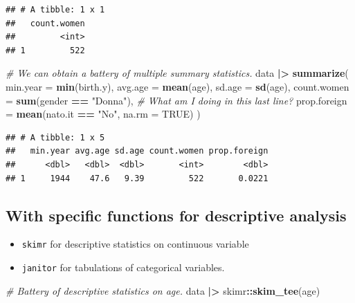 \documentclass[
]{book}
\newenvironment{Shaded}{\begin{snugshade}}{\end{snugshade}}
\newcommand{\AttributeTok}[1]{\textcolor[rgb]{0.13,0.29,0.53}{#1}}
\newcommand{\CommentTok}[1]{\textcolor[rgb]{0.56,0.35,0.01}{\textit{#1}}}
\newcommand{\ConstantTok}[1]{\textcolor[rgb]{0.56,0.35,0.01}{#1}}
\newcommand{\FunctionTok}[1]{\textcolor[rgb]{0.13,0.29,0.53}{\textbf{#1}}}
\newcommand{\NormalTok}[1]{#1}
\newcommand{\SpecialCharTok}[1]{\textcolor[rgb]{0.81,0.36,0.00}{\textbf{#1}}}
\newcommand{\StringTok}[1]{\textcolor[rgb]{0.31,0.60,0.02}{#1}}
\providecommand{\tightlist}{%
  \setlength{\itemsep}{0pt}\setlength{\parskip}{0pt}}
\begin{document}
\begin{verbatim}
## # A tibble: 1 x 1
##   count.women
##         <int>
## 1         522
\end{verbatim}

\begin{Shaded}
\begin{Highlighting}[]
\CommentTok{\# We can obtain a battery of multiple summary statistics.}
\NormalTok{data }\SpecialCharTok{|\textgreater{}} 
  \FunctionTok{summarize}\NormalTok{(}
    \AttributeTok{min.year =} \FunctionTok{min}\NormalTok{(birth.y),}
    \AttributeTok{avg.age =} \FunctionTok{mean}\NormalTok{(age),}
    \AttributeTok{sd.age =} \FunctionTok{sd}\NormalTok{(age),}
    \AttributeTok{count.women =} \FunctionTok{sum}\NormalTok{(gender }\SpecialCharTok{==} \StringTok{"Donna"}\NormalTok{),}
    \CommentTok{\# What am I doing in this last line?}
    \AttributeTok{prop.foreign =} \FunctionTok{mean}\NormalTok{(nato.it }\SpecialCharTok{==} \StringTok{"No"}\NormalTok{, }\AttributeTok{na.rm =} \ConstantTok{TRUE}\NormalTok{)}
\NormalTok{  )}
\end{Highlighting}
\end{Shaded}

\begin{verbatim}
## # A tibble: 1 x 5
##   min.year avg.age sd.age count.women prop.foreign
##      <dbl>   <dbl>  <dbl>       <int>        <dbl>
## 1     1944    47.6   9.39         522       0.0221
\end{verbatim}

\hypertarget{with-specific-functions-for-descriptive-analysis}{%
\subsection{With specific functions for descriptive analysis}\label{with-specific-functions-for-descriptive-analysis}}

\begin{itemize}
\tightlist
\item
  \texttt{skimr} for descriptive statistics on continuous variable
\item
  \texttt{janitor} for tabulations of categorical variables.
\end{itemize}

\begin{Shaded}
\begin{Highlighting}[]
\CommentTok{\# Battery of descriptive statistics on age.}
\NormalTok{data }\SpecialCharTok{|\textgreater{}} 
\NormalTok{  skimr}\SpecialCharTok{::}\FunctionTok{skim\_tee}\NormalTok{(age)}
\end{Highlighting}
\end{Shaded}
\end{document}
